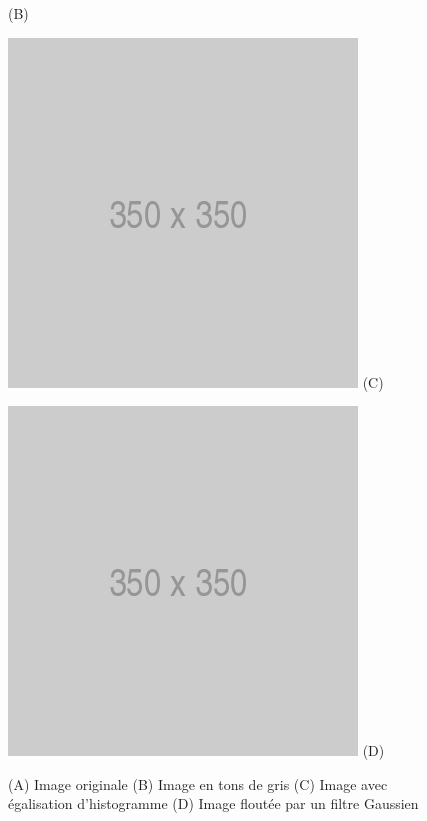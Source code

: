 \begin{figure}[htp]
\begin{minipage}{0.4\textwidth}
  (B)
\end{minipage}
\begin{minipage}{0.4\textwidth}
  \centering
  \includegraphics[width=\linewidth]{images/placeholder.png}
  (C)
\end{minipage}
\begin{minipage}{0.4\textwidth}
  \centering
  \includegraphics[width=\linewidth]{images/placeholder.png}
  (D)
\end{minipage}
\caption{(A) Image originale (B) Image en tons de gris (C) Image avec égalisation d'histogramme (D) Image floutée par un filtre Gaussien}
\label{fig:detection_pretraitement}
\end{figure}

